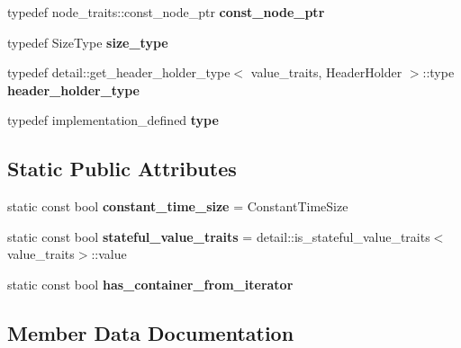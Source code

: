 \begin{DoxyCompactItemize}
\mbox{\label{classboost_1_1intrusive_1_1suffix__automata__impl_acf5340d09b102d7fa183bcb304e96d0b}} 
typedef node\+\_\+traits\+::const\+\_\+node\+\_\+ptr {\bfseries const\+\_\+node\+\_\+ptr}
\item 
\mbox{\label{classboost_1_1intrusive_1_1suffix__automata__impl_ad2fe9bd542f914c94c7d0e42cce5613c}} 
typedef Size\+Type {\bfseries size\+\_\+type}
\item 
\mbox{\label{classboost_1_1intrusive_1_1suffix__automata__impl_a0b9a7a78415c25b6b3f377e1269f539a}} 
typedef detail\+::get\+\_\+header\+\_\+holder\+\_\+type$<$ value\+\_\+traits, Header\+Holder $>$\+::type {\bfseries header\+\_\+holder\+\_\+type}
\item 
\mbox{\label{classboost_1_1intrusive_1_1suffix__automata__impl_a76a20cdbdf29b17f23f7b2aefd24bbc9}} 
typedef implementation\+\_\+defined {\bfseries type}
\end{DoxyCompactItemize}
\subsection*{Static Public Attributes}
\begin{DoxyCompactItemize}
\item 
\mbox{\label{classboost_1_1intrusive_1_1suffix__automata__impl_a4ffbd604417f1c388d85c9bf5a08ef90}} 
static const bool {\bfseries constant\+\_\+time\+\_\+size} = Constant\+Time\+Size
\item 
\mbox{\label{classboost_1_1intrusive_1_1suffix__automata__impl_a8b3e4a8ac09a199402f3ce94158ceaca}} 
static const bool {\bfseries stateful\+\_\+value\+\_\+traits} = detail\+::is\+\_\+stateful\+\_\+value\+\_\+traits$<$value\+\_\+traits$>$\+::value
\item 
static const bool {\bfseries has\+\_\+container\+\_\+from\+\_\+iterator}
\end{DoxyCompactItemize}


\subsection{Member Data Documentation}
\mbox{\label{classboost_1_1intrusive_1_1suffix__automata__impl_ab68c4f8919bedcfba1ce98368521401c}} 
